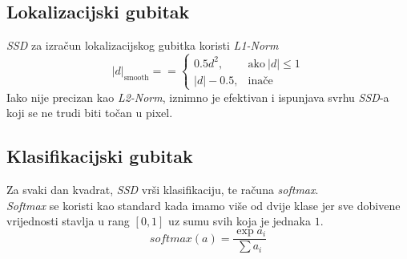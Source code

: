 \subsection{Lokalizacijski gubitak}
\emph{SSD} za izračun lokalizacijskog gubitka koristi \emph{L1-Norm}
$$|d|_\text{smooth} == \begin{cases}0.5d^2, &\text{ako}\  |d| \leq{1} \\ |d|-0.5, & \text{inače}\end{cases}$$
Iako nije precizan kao \emph{L2-Norm}, iznimno je efektivan i ispunjava svrhu \emph{SSD}-a koji se ne trudi biti točan u pixel.
\subsection{Klasifikacijski gubitak}
Za svaki dan kvadrat, \emph{SSD} vrši klasifikaciju, te računa \emph{softmax}. \\
\emph{Softmax} se koristi kao standard kada imamo više od dvije klase jer sve dobivene vrijednosti stavlja u rang $[0, 1]$ uz sumu svih koja je jednaka $1$.
$$softmax(a)=\frac{\exp{a_i}}{\sum{a_i}}$$

